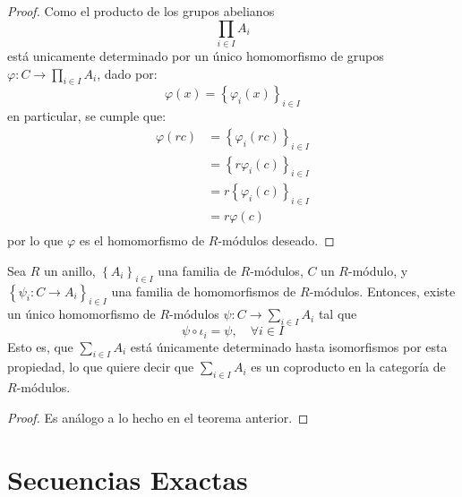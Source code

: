 \documentclass[12pt]{report}
\newcounter{it}
\theoremstyle{largebreak}
\newcommand\cf[3]{\ensuremath{#1:#2\rightarrow#3}}
\begin{document}
    \begin{proof}
        Como el producto de los grupos abelianos
        \begin{equation*}
            \prod_{ i\in I}A_i
        \end{equation*}
        está unicamente determinado por un único homomorfismo de grupos $\cf{\varphi}{C}{\prod_{ i\in I}A_i}$, dado por:
        \begin{equation*}
            \varphi(x)=\left\{\varphi_i(x) \right\}_{i\in I}
        \end{equation*}
        en particular, se cumple que:
        \begin{equation*}
            \begin{split}
                \varphi(rc)&=\left\{\varphi_i(rc) \right\}_{ i\in I}\\
                &=\left\{r\varphi_i(c) \right\}_{ i\in I}\\
                &=r\left\{\varphi_i(c) \right\}_{ i\in I}\\
                &=r\varphi(c)\\
            \end{split}
        \end{equation*}
        por lo que $\varphi$ es el homomorfismo de $R$-módulos deseado.
    \end{proof}

    \begin{theor}
        Sea $R$ un anillo, $\left\{A_i \right\}_{ i\in I}$ una familia de $R$-módulos, $C$ un $R$-módulo, y $\left\{\cf{\psi_i}{C}{A_i} \right\}_{ i\in I}$ una familia de homomorfismos de $R$-módulos. Entonces, existe un único homomorfismo de $R$-módulos $\cf{\psi}{C}{\sum_{ i\in I}A_i}$ tal que
        \begin{equation*}
            \psi\circ\iota_i=\psi,\quad\forall i\in I
        \end{equation*}
        Esto es, que $\sum_{ i\in I}A_i$ está únicamente determinado hasta isomorfismos por esta propiedad, lo que quiere decir que $\sum_{ i\in I}A_i$ es un coproducto en la categoría de $R$-módulos.
    \end{theor}

    \begin{proof}
        Es análogo a lo hecho en el teorema anterior.
    \end{proof}


    \section{Secuencias Exactas}
\end{document}
